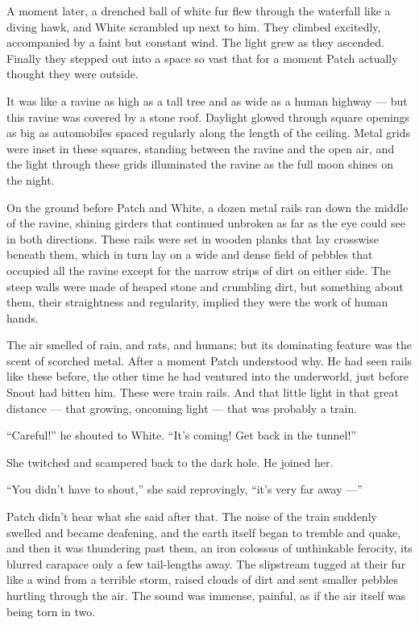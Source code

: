 \documentclass[ebook,oneside,openany,17pt]{memoir}
\begin{document}
A moment later, a drenched ball of white fur flew through the
waterfall like a diving hawk, and White scrambled up next to him. They
climbed excitedly, accompanied by a faint but constant wind. The light
grew as they ascended. Finally they stepped out into a space so vast
that for a moment Patch actually thought they were outside.

It was like a ravine as high as a tall tree and as wide as a human
highway — but this ravine was covered by a stone roof. Daylight glowed
through square openings as big as automobiles spaced regularly along
the length of the ceiling. Metal grids were inset in these squares,
standing between the ravine and the open air, and the light through
these grids illuminated the ravine as the full moon shines on the
night.

On the ground before Patch and White, a dozen metal rails ran down the
middle of the ravine, shining girders that continued unbroken as far
as the eye could see in both directions. These rails were set in
wooden planks that lay crosswise beneath them, which in turn lay on a
wide and dense field of pebbles that occupied all the ravine except
for the narrow strips of dirt on either side. The steep walls were
made of heaped stone and crumbling dirt, but something about them,
their straightness and regularity, implied they were the work of human
hands.

The air smelled of rain, and rats, and humans; but its dominating
feature was the scent of scorched metal. After a moment Patch
understood why. He had seen rails like these before, the other time he
had ventured into the underworld, just before Snout had bitten
him. These were train rails. And that little light in that great
distance — that growing, oncoming light — that was probably a train.

“Careful!” he shouted to White. “It’s coming! Get back in the tunnel!”

She twitched and scampered back to the dark hole. He joined her.

“You didn’t have to shout,” she said reprovingly, “it’s very far away
—”

Patch didn’t hear what she said after that. The noise of the train
suddenly swelled and became deafening, and the earth itself began to
tremble and quake, and then it was thundering past them, an iron
colossus of unthinkable ferocity, its blurred carapace only a few
tail-lengths away. The slipstream tugged at their fur like a wind from
a terrible storm, raised clouds of dirt and sent smaller pebbles
hurtling through the air. The sound was immense, painful, as if the
air itself was being torn in two.
\end{document}
